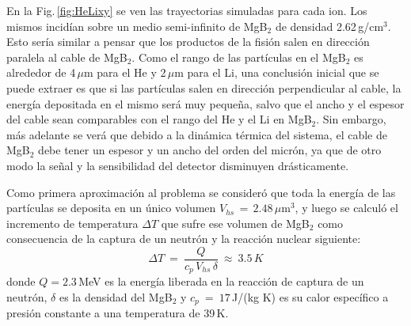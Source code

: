 En la Fig.\,\ref{fig:HeLixy} se ven las trayectorias simuladas para cada ion. Los mismos incidían sobre un medio semi-infinito de MgB$_2$ de densidad 2.62\,g/cm$^{3}$\cite{Lui2003}. Esto sería similar a pensar que los productos de la fisión salen en dirección paralela al cable de MgB$_2$. Como el rango de las partículas en el MgB$_2$ es alrededor de 4\,$\mu$m para el He y 2\,$\mu$m para el Li, una conclusión inicial que se puede extraer es que si las partículas salen en dirección perpendicular al cable, la energía depositada en el mismo será muy pequeña, salvo que el ancho y el espesor del cable sean comparables con el rango del He y el Li en MgB$_2$. Sin embargo, más adelante se verá que debido a la dinámica térmica del sistema, el cable de MgB$_2$ debe tener un espesor y un ancho del orden del micrón, ya que de otro modo la señal y la sensibilidad del detector disminuyen drásticamente.

Como primera aproximación al problema se consideró que toda la energía de las partículas se deposita en un único volumen $V_{hs} \, = \, 2.48 \, \mu$m$^3$, y luego se calculó el incremento de temperatura $\Delta T$ que sufre ese volumen de MgB$_2$ como consecuencia de la captura de un neutrón y la reacción nuclear siguiente:
\begin{equation}
  \Delta T \ = \ \frac{Q}{c_p\,V_{hs}\, \delta} \ \approx \ 3.5 \, K
  \label{eq:DT}
\end{equation}
\noindent
donde $Q = 2.3$\,MeV\cite{Nishikawa2008} es la energía liberada en la reacción de captura de un neutrón, $\delta$ es la densidad del MgB$_2$ \cite{Lui2003} y $c_p \ = \ 17$\,J/(kg K) es su calor específico a presión constante \cite{Putti2003} a una temperatura de 39\,K.

